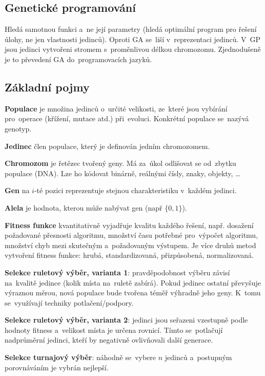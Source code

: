 \subsection{Genetické programování}

Hledá samotnou funkci a~ne její parametry (hledá optimální program pro řešení úlohy, ne jen vlastnosti jedinců). Oproti GA se~liší v~reprezentaci jedinců. V~GP jsou jedinci vytvořeni stromem s~proměnlivou délkou chromozomu. Zjednodušeně je to převedení GA do~programovacích jazyků.

\subsection{Základní pojmy}

\textbf{Populace} je množina jedinců o~určité velikosti, ze~které jsou vybírání pro~operace (křížení, mutace atd.) při~evoluci. Konkrétní populace se~nazývá genotyp.

\textbf{Jedinec} člen populace, který je definován jedním chromozomem.

\textbf{Chromozom} je řetězec tvořený geny. Má za~úkol odlišovat se od~zbytku populace (DNA). Lze ho kódovat binárně, reálnými čísly, znaky, objekty, \dots

\textbf{Gen} na \( i \)-té pozici reprezentuje stejnou charakteristiku v~každém jedinci.

\textbf{Alela} je hodnota, kterou může nabývat gen (např \( \{0, 1\} \)).

\textbf{Fitness funkce} kvantitativně vyjadřuje kvalitu každého řešení, např. dosažení požadované přesnosti algoritmu, množství času potřebné pro~výpočet algoritmu, množství chyb mezi skutečným a~požadovaným výstupem. Je více druhů metod vytvoření fitness funkce: hrubá, standardizovaná, přizpůsobená, normalizovaná.

\textbf{Selekce ruletový výběr, varianta 1}: pravděpodobnost výběru závisí na~kvalitě jedince (kolik místa na~ruletě zabírá). Pokud jedinec ostatní převyšuje výraznou měrou, nová populace bude tvořena téměř výhradně jeho geny. K~tomu se~využívají techniky potlačení/podpory.

\textbf{Selekce ruletový výběr, varianta 2}: jedinci jsou seřazeni vzestupně podle hodnoty fitness a~velikost místa je určena rovnicí. Tímto se~potlačují nadprůměrní jedinci, kteří by negativně ovlivňovali další generace.

\textbf{Selekce turnajový výběr}: náhodně se~vybere \( n \) jedinců a~postupným porovnáváním je vybrán nejlepší.

